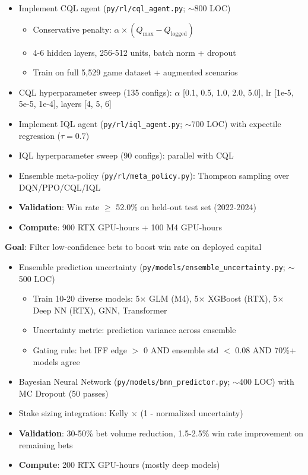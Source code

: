 \begin{itemize}
  \item {} Implement CQL agent (\texttt{py/rl/cql\_agent.py}; $\sim$800 LOC)
  \begin{itemize}
    \item Conservative penalty: $\alpha \times (Q_{\max} - Q_{\text{logged}})$
    \item 4-6 hidden layers, 256-512 units, batch norm + dropout
    \item Train on full 5,529 game dataset + augmented scenarios
  \end{itemize}
  \item {} CQL hyperparameter sweep (135 configs): $\alpha$ [0.1, 0.5, 1.0, 2.0, 5.0], lr [1e-5, 5e-5, 1e-4], layers [4, 5, 6]
  \item {} Implement IQL agent (\texttt{py/rl/iql\_agent.py}; $\sim$700 LOC) with expectile regression ($\tau=0.7$)
  \item {} IQL hyperparameter sweep (90 configs): parallel with CQL
  \item {} Ensemble meta-policy (\texttt{py/rl/meta\_policy.py}): Thompson sampling over DQN/PPO/CQL/IQL
  \item {} \textbf{Validation}: Win rate $\ge$ 52.0\% on held-out test set (2022-2024)
  \item \textbf{Compute}: 900 RTX GPU-hours + 100 M4 GPU-hours
\end{itemize}

\textbf{Goal}: Filter low-confidence bets to boost win rate on deployed capital

\begin{itemize}
  \item {} Ensemble prediction uncertainty (\texttt{py/models/ensemble\_uncertainty.py}; $\sim$500 LOC)
  \begin{itemize}
    \item Train 10-20 diverse models: 5$\times$ GLM (M4), 5$\times$ XGBoost (RTX), 5$\times$ Deep NN (RTX), GNN, Transformer
    \item Uncertainty metric: prediction variance across ensemble
    \item Gating rule: bet IFF edge $>$ 0 AND ensemble std $<$ 0.08 AND 70\%+ models agree
  \end{itemize}
  \item {} Bayesian Neural Network (\texttt{py/models/bnn\_predictor.py}; $\sim$400 LOC) with MC Dropout (50 passes)
  \item {} Stake sizing integration: Kelly $\times$ (1 - normalized uncertainty)
  \item {} \textbf{Validation}: 30-50\% bet volume reduction, 1.5-2.5\% win rate improvement on remaining bets
  \item \textbf{Compute}: 200 RTX GPU-hours (mostly deep models)
\end{itemize}

